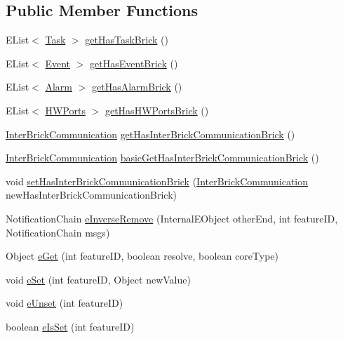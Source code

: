\subsection*{Public Member Functions}
\begin{DoxyCompactItemize}
\item 
E\-List$<$ \hyperlink{interfaceshootingmachineemfmodel_1_1_task}{Task} $>$ \hyperlink{classshootingmachineemfmodel_1_1impl_1_1_brick_impl_a31e7ecea8f97c7c733ba4ecf8589efc5}{get\-Has\-Task\-Brick} ()
\item 
E\-List$<$ \hyperlink{interfaceshootingmachineemfmodel_1_1_event}{Event} $>$ \hyperlink{classshootingmachineemfmodel_1_1impl_1_1_brick_impl_a57a8d0eb0228c2f91f38d58ea6e092ac}{get\-Has\-Event\-Brick} ()
\item 
E\-List$<$ \hyperlink{interfaceshootingmachineemfmodel_1_1_alarm}{Alarm} $>$ \hyperlink{classshootingmachineemfmodel_1_1impl_1_1_brick_impl_a850d537faaa42e077de53bed8e629a19}{get\-Has\-Alarm\-Brick} ()
\item 
E\-List$<$ \hyperlink{interfaceshootingmachineemfmodel_1_1_h_w_ports}{H\-W\-Ports} $>$ \hyperlink{classshootingmachineemfmodel_1_1impl_1_1_brick_impl_aab300b09314059764d15304583bebebb}{get\-Has\-H\-W\-Ports\-Brick} ()
\item 
\hyperlink{interfaceshootingmachineemfmodel_1_1_inter_brick_communication}{Inter\-Brick\-Communication} \hyperlink{classshootingmachineemfmodel_1_1impl_1_1_brick_impl_aca43b282e7e1c127e521f51f9dbb7e38}{get\-Has\-Inter\-Brick\-Communication\-Brick} ()
\item 
\hyperlink{interfaceshootingmachineemfmodel_1_1_inter_brick_communication}{Inter\-Brick\-Communication} \hyperlink{classshootingmachineemfmodel_1_1impl_1_1_brick_impl_a17de95deffb0c3d25d589ac08afeffd3}{basic\-Get\-Has\-Inter\-Brick\-Communication\-Brick} ()
\item 
void \hyperlink{classshootingmachineemfmodel_1_1impl_1_1_brick_impl_a89aac72e198bdcc76b3d402731a9b66e}{set\-Has\-Inter\-Brick\-Communication\-Brick} (\hyperlink{interfaceshootingmachineemfmodel_1_1_inter_brick_communication}{Inter\-Brick\-Communication} new\-Has\-Inter\-Brick\-Communication\-Brick)
\item 
Notification\-Chain \hyperlink{classshootingmachineemfmodel_1_1impl_1_1_brick_impl_ab104509cb1d14e590907d4f1e6c97517}{e\-Inverse\-Remove} (Internal\-E\-Object other\-End, int feature\-I\-D, Notification\-Chain msgs)
\item 
Object \hyperlink{classshootingmachineemfmodel_1_1impl_1_1_brick_impl_ae52c9aede3f2a992c28aa6f5996b0ee1}{e\-Get} (int feature\-I\-D, boolean resolve, boolean core\-Type)
\item 
void \hyperlink{classshootingmachineemfmodel_1_1impl_1_1_brick_impl_aebe50ab82342ebbd6596307d09c15ef7}{e\-Set} (int feature\-I\-D, Object new\-Value)
\item 
void \hyperlink{classshootingmachineemfmodel_1_1impl_1_1_brick_impl_a04bba07f71fa09ed3df6d5ffab255d6d}{e\-Unset} (int feature\-I\-D)
\item 
boolean \hyperlink{classshootingmachineemfmodel_1_1impl_1_1_brick_impl_afe010a7a25132e73190ee361d5579eff}{e\-Is\-Set} (int feature\-I\-D)
\end{DoxyCompactItemize}
